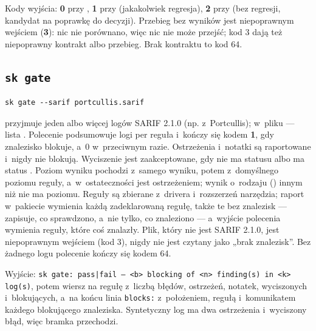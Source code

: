 Kody wyjścia: \textbf{0} przy , \textbf{1} przy  (jakakolwiek
regresja), \textbf{2} przy  (bez regresji, kandydat na poprawkę do decyzji).
Przebieg bez wyników jest niepoprawnym wejściem (\textbf{3}): nic nie porównano, więc nic nie
może przejść; kod 3 dają też niepoprawny kontrakt albo przebieg. Brak kontraktu to kod 64.


\subsection{\texttt{sk gate}}\label{sec:cli-gate}

\begin{lstlisting}
sk gate --sarif portcullis.sarif
\end{lstlisting}

 przyjmuje jeden albo więcej logów SARIF 2.1.0 (np. z~Portcullis); w~pliku --- lista . Polecenie podsumowuje logi per reguła i~kończy się kodem
\textbf{1}, gdy znalezisko blokuje, a~0 w~przeciwnym razie.  Ostrzeżenia i~notatki są
raportowane i~nigdy nie blokują. Wyciszenie jest zaakceptowane, gdy nie ma statusu albo ma
status . Poziom wyniku pochodzi z~samego wyniku, potem z~domyślnego poziomu
reguły, a~w~ostateczności jest ostrzeżeniem; wynik o~rodzaju () innym niż
 nie ma poziomu. Reguły są zbierane z~drivera i~rozszerzeń narzędzia; raport w~pakiecie wymienia każdą zadeklarowaną regułę, także te bez znalezisk --- zapisuje, co
sprawdzono, a~nie tylko, co znaleziono --- a~wyjście polecenia wymienia reguły, które coś
znalazły. Plik, który nie jest SARIF 2.1.0, jest niepoprawnym wejściem (kod 3), nigdy nie
jest czytany jako „brak znalezisk”. Bez żadnego logu polecenie kończy się kodem 64.

Wyjście: \texttt{sk gate: pass|fail — <b> blocking of <n> finding(s) in <k> log(s)}, potem
wiersz na regułę z~liczbą błędów, ostrzeżeń, notatek, wyciszonych i~blokujących, a~na końcu
linia \texttt{blocks:} z~położeniem, regułą i~komunikatem każdego blokującego znaleziska.
Syntetyczny log  ma dwa ostrzeżenia i~wyciszony błąd, więc
bramka przechodzi.

